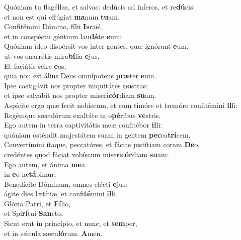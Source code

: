 \evenverse Quóniam tu flagéllas, et salvas: dedúcis ad ínferos, et re\textbf{dú}cis:~\*\\
\evenverse et non est qui effúgiat \textbf{ma}num \textbf{tu}am.\\
\oddverse Confitémini Dómino, fílii \textbf{Is}raël,~\*\\
\oddverse et in conspéctu géntium lau\textbf{dá}te \textbf{e}um:\\
\evenverse Quóniam ídeo dispérsit vos inter gentes, quæ ignórant \textbf{e}um,~\*\\
\evenverse ut vos enarrétis mira\textbf{bí}lia \textbf{e}jus,\\
\oddverse Et faciátis scire \textbf{e}os,~\*\\
\oddverse quia non est álius Deus omnípotens \textbf{præ}ter \textbf{e}um.\\
\evenverse Ipse castigávit nos propter iniquitátes \textbf{no}stras:~\*\\
\evenverse et ipse salvábit nos propter miseri\textbf{cór}diam \textbf{su}am.\\
\oddverse Aspícite ergo quæ fecit nobíscum, et cum timóre et tremóre confitémini \textbf{il}li:~\*\\
\oddverse Regémque sæculórum exaltáte in o\textbf{pé}ribus \textbf{ve}stris.\\
\evenverse Ego autem in terra captivitátis meæ confitébor \textbf{il}li:~\*\\
\evenverse quóniam osténdit majestátem suam in gentem \textbf{pec}ca\textbf{trí}cem.\\
\oddverse Convertímini ítaque, peccatóres, et fácite justítiam coram \textbf{De}o,~\*\\
\oddverse credéntes quod fáciat vobíscum miseri\textbf{cór}diam \textbf{su}am:\\
\evenverse Ego autem, et ánima \textbf{me}a~\*\\
\evenverse in \textbf{e}o læ\textbf{tá}bimur.\\
\oddverse Benedícite Dóminum, omnes elécti \textbf{e}jus:~\*\\
\oddverse ágite dies lætítiæ, et confi\textbf{té}mini \textbf{il}li.\\
\evenverse Glória Patri, et \textbf{Fí}lio,~\*\\
\evenverse et Spi\textbf{rí}tui \textbf{San}cto.\\
\oddverse Sicut erat in princípio, et nunc, et \textbf{sem}per,~\*\\
\oddverse et in sǽcula sæcu\textbf{ló}rum. \textbf{A}men.\\
